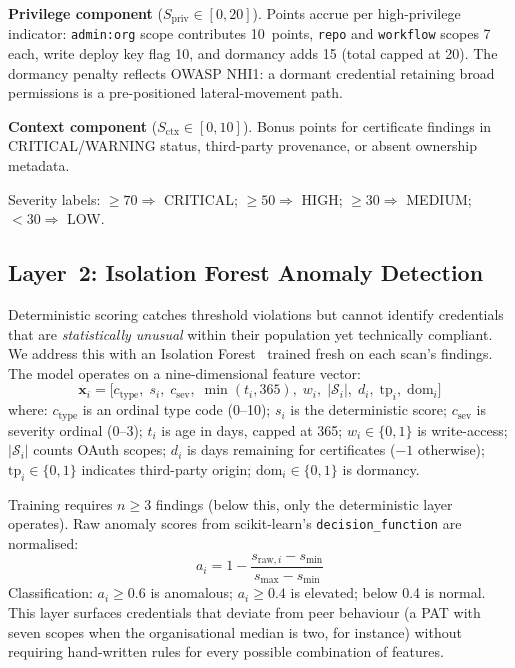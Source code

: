 \documentclass[journal]{IEEEtran}
\begin{document}
\textbf{Privilege component} ($S_{\mathrm{priv}} \in [0, 20]$). Points accrue per high-privilege indicator: \texttt{admin:org} scope contributes 10~points, \texttt{repo} and \texttt{workflow} scopes 7 each, write deploy key flag 10, and dormancy adds 15 (total capped at 20). The dormancy penalty reflects OWASP NHI1: a dormant credential retaining broad permissions is a pre-positioned lateral-movement path.

\textbf{Context component} ($S_{\mathrm{ctx}} \in [0, 10]$). Bonus points for certificate findings in CRITICAL/WARNING status, third-party provenance, or absent ownership metadata.

Severity labels: $\geq 70 \Rightarrow$ CRITICAL; $\geq 50 \Rightarrow$ HIGH; $\geq 30 \Rightarrow$ MEDIUM; $< 30 \Rightarrow$ LOW.

\subsection{Layer~2: Isolation Forest Anomaly Detection}

Deterministic scoring catches threshold violations but cannot identify credentials that are \emph{statistically unusual} within their population yet technically compliant. We address this with an Isolation Forest~\cite{liu2008isolation} trained fresh on each scan's findings. The model operates on a nine-dimensional feature vector:
\begin{equation}
  \mathbf{x}_i = \bigl[
    c_{\mathrm{type}},\; s_i,\; c_{\mathrm{sev}},\; \min(t_i,365),\;
    w_i,\; |\mathcal{S}_i|,\; d_i,\; \mathrm{tp}_i,\; \mathrm{dom}_i
  \bigr]
  \label{eq:features}
\end{equation}
where: $c_{\mathrm{type}}$ is an ordinal type code (0--10); $s_i$ is the deterministic score; $c_{\mathrm{sev}}$ is severity ordinal (0--3); $t_i$ is age in days, capped at 365; $w_i \in \{0,1\}$ is write-access; $|\mathcal{S}_i|$ counts OAuth scopes; $d_i$ is days remaining for certificates ($-1$ otherwise); $\mathrm{tp}_i \in \{0,1\}$ indicates third-party origin; $\mathrm{dom}_i \in \{0,1\}$ is dormancy.

Training requires $n \geq 3$ findings (below this, only the deterministic layer operates). Raw anomaly scores from scikit-learn's \texttt{decision\_function} are normalised:
\[
  a_i = 1 - \frac{s_{\mathrm{raw},i} - s_{\min}}{s_{\max} - s_{\min}}
\]
Classification: $a_i \geq 0.6$ is anomalous; $a_i \geq 0.4$ is elevated; below 0.4 is normal. This layer surfaces credentials that deviate from peer behaviour (a PAT with seven scopes when the organisational median is two, for instance) without requiring hand-written rules for every possible combination of features.
\end{document}
